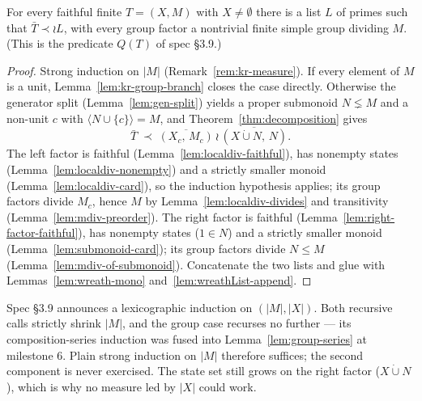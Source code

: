 \begin{theorem}\label{thm:kr-bar}
  \leanok
  For every faithful finite $T = (X, M)$ with $X \neq \emptyset$
  there is a list $L$ of primes such that $\bar{T} \prec \wr L$, with
  every group factor a nontrivial finite simple group dividing $M$.
  (This is the predicate $Q(T)$ of spec \S 3.9.)
\end{theorem}
\begin{proof}
  \leanok
  Strong induction on $|M|$ (Remark~\ref{rem:kr-measure}). If every
  element of $M$ is a unit, Lemma~\ref{lem:kr-group-branch} closes
  the case directly. Otherwise the generator split
  (Lemma~\ref{lem:gen-split}) yields a proper submonoid $N \lneq M$
  and a non-unit $c$ with $\langle N \cup \{c\} \rangle = M$, and
  Theorem~\ref{thm:decomposition} gives
  \[
    \bar{T} \;\prec\; \overline{(X_c,\, M_c)} \,\wr\,
      \overline{(X \mathbin{\dot\cup} N,\, N)} .
  \]
  The left factor is faithful (Lemma~\ref{lem:localdiv-faithful}),
  has nonempty states (Lemma~\ref{lem:localdiv-nonempty}) and a
  strictly smaller monoid (Lemma~\ref{lem:localdiv-card}), so the
  induction hypothesis applies; its group factors divide $M_c$, hence
  $M$ by Lemma~\ref{lem:localdiv-divides} and transitivity
  (Lemma~\ref{lem:mdiv-preorder}). The right factor is faithful
  (Lemma~\ref{lem:right-factor-faithful}), has nonempty states
  ($1 \in N$) and a strictly smaller monoid
  (Lemma~\ref{lem:submonoid-card}); its group factors divide
  $N \le M$ (Lemma~\ref{lem:mdiv-of-submonoid}). Concatenate the two
  lists and glue with Lemmas~\ref{lem:wreath-mono}
  and~\ref{lem:wreathList-append}.
\end{proof}

\begin{remark}\label{rem:kr-measure}
  Spec \S 3.9 announces a lexicographic induction on $(|M|, |X|)$.
  Both recursive calls strictly shrink $|M|$, and the group case
  recurses no further --- its composition-series induction was fused
  into Lemma~\ref{lem:group-series} at milestone 6. Plain strong
  induction on $|M|$ therefore suffices; the second component is
  never exercised. The state set still grows on the right factor
  ($X \mathbin{\dot\cup} N$), which is why no measure led by $|X|$ could work.
\end{remark}

